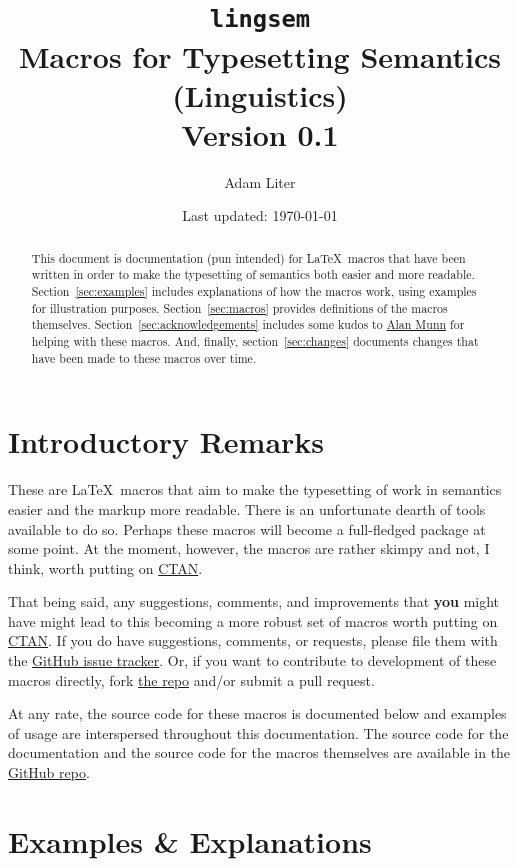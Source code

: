 \documentclass{article}
\title{\texttt{lingsem} \\ Macros for Typesetting Semantics (Linguistics) \\ Version 0.1}
\author{Adam Liter}
\date{Last updated: \today}
\begin{document}
\maketitle

\begin{abstract}
This document is documentation (pun intended) for \LaTeX\ macros that have been written in order to make the typesetting of semantics both easier and more readable. Section~\ref{sec:examples} includes explanations of how the macros work, using examples for illustration purposes. Section~\ref{sec:macros} provides definitions of the macros themselves. Section~\ref{sec:acknowledgements} includes some kudos to \href{http://tex.stackexchange.com/users/2693/alan-munn}{Alan Munn} for helping with these macros. And, finally, section~\ref{sec:changes} documents changes that have been made to these macros over time. 
\end{abstract}

\section{Introductory Remarks}

These are \LaTeX\ macros that aim to make the typesetting of work in semantics easier and the markup more readable. There is an unfortunate dearth of tools available to do so. Perhaps these macros will become a full-fledged package at some point. At the moment, however, the macros are rather skimpy and not, I think, worth putting on \href{http://ctan.org}{CTAN}.

That being said, any suggestions, comments, and improvements that \textbf{you} might have might lead to this becoming a more robust set of macros worth putting on \href{http://ctan.org}{CTAN}. If you do have suggestions, comments, or requests, please file them with the \href{https://github.com/adamliter/lingsem/issues}{GitHub issue tracker}. Or, if you want to contribute to development of these macros directly, fork \href{https://github.com/adamliter/lingsem}{the repo} and/or submit a pull request.

At any rate, the source code for these macros is documented below and examples of usage are interspersed throughout this documentation. The source code for the documentation and the source code for the macros themselves are available in the \href{https://github.com/adamliter/lingsem}{GitHub repo}.

\section{Examples \& Explanations}\label{sec:examples}
\end{document}
